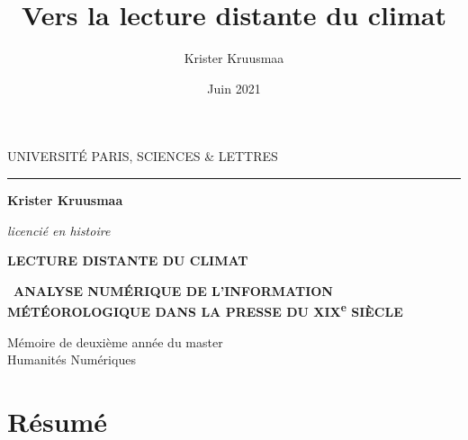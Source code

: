 \documentclass[a4paper,twoside,12pt]{article}
\title{Vers la lecture distante du climat}
\author{Krister Kruusmaa}
\date{Juin 2021}
\begin{document}


\begin{titlepage}
\begin{center}

\bigskip

\begin{large}
UNIVERSITÉ PARIS, SCIENCES \& LETTRES
\end{large}
\begin{center}\rule{2cm}{0.02cm}\end{center}

\bigskip
\bigskip
\bigskip
\begin{Large}
\textbf{Krister Kruusmaa}\\
\end{Large}
\begin{normalsize} \textit{licencié en histoire}\\
\end{normalsize}

\bigskip
\bigskip
\bigskip
\bigskip
\bigskip
\bigskip
\bigskip

\begin{Huge}
\textbf{LECTURE DISTANTE DU CLIMAT}\\
\end{Huge}
\bigskip
\begin{LARGE}
\
\textbf{ANALYSE NUMÉRIQUE DE L'INFORMATION MÉTÉOROLOGIQUE DANS LA PRESSE DU XIX\textsuperscript{e} SIÈCLE}\\
\end{LARGE}

\bigskip
\bigskip
\begin{large}
\end{large}
\vfill

\begin{large}
Mémoire de deuxième année du master\\
\og Humanités Numériques \fg{} \\
\end{large}

\end{center}
\end{titlepage}

\thispagestyle{empty}

\section*{Résumé}
\end{document}
